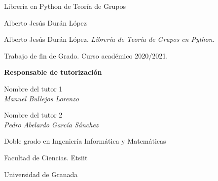 

\newcommand{\miTutor}{
  Nombre del tutor 1 \\ \emph{Manuel Bullejos Lorenzo} 
  \\\medskip

  Nombre del tutor 2 \\ \emph{Pedro Abelardo García Sánchez}
}

\thispagestyle{empty}

\newpage
\blankpage


\begin{center}
  \large  


  \begingroup
  \huge{Librería en Python de Teoría de Grupos} \\ \bigskip
  \endgroup

  \textrm{Alberto Jesús Durán López}


\end{center}  

\newpage
\thispagestyle{empty}




\newpage 

\hfill

\vspace{10cm}

Alberto Jesús Durán López. \textit{Librería de Teoría de Grupos en Python}.

Trabajo de fin de Grado. Curso académico 2020/2021.
\bigskip

\begin{minipage}[t]{0.25\textwidth}
  \flushleft
  \textbf{Responsable de tutorización}
\end{minipage}
\begin{minipage}[t]{0.45\textwidth}
  \flushleft
  \miTutor
\end{minipage}
\begin{minipage}[t]{0.30\textwidth}
  \flushright
  Doble grado en Ingeniería Informática y Matemáticas
  \medskip

  Facultad de Ciencias. Etsiit
  \medskip

  Universidad de Granada
\end{minipage}


\endinput

